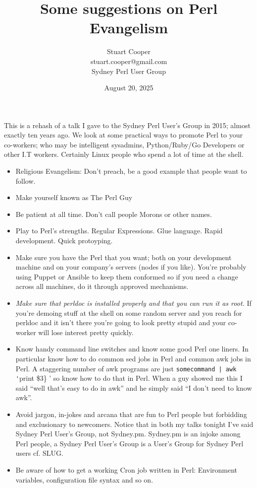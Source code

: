 \documentclass{article}      %
\title{Some suggestions on Perl Evangelism}
\author{Stuart Cooper\\stuart.cooper@gmail.com\\Sydney Perl User Group}
\date{August 20, 2025}
\begin{document}

\maketitle                   %

This is a rehash of a talk I gave to the Sydney Perl User's Group in
2015; almost exactly ten years ago. We look at some practical ways to
promote Perl to your co-workers; who may be intelligent sysadmins,
Python/Ruby/Go Developers or other I.T workers. Certainly Linux people
who spend a lot of time at the shell.

\begin{itemize}
  \item Religious Evangelism: Don't preach, be a good example that
    people want to follow.
  \item Make yourself known as The Perl Guy
  \item Be patient at all time. Don't call people Morons or other
    names. 
  \item Play to Perl's strengths. Regular Expressions. Glue
    language. Rapid development. Quick protoyping.
  \item Make sure you have the Perl that you want; both on your
    development machine and on your company's servers (nodes if you
    like). You're probably using Puppet or Ansible to keep them
    conformed so if you need a change across all machines, do it
    through approved mechanisms.
  \item \emph{Make sure that \emph{perldoc} is installed properly and that
  you can run it as root.} If you're demoing stuff at the shell on some
    random server and you reach for perldoc and it isn't there you're
    going to look pretty stupid and your co-worker will lose interest
    pretty quickly.
  \item Know handy command line switches and know some good Perl one
    liners. In particular know how to do common sed jobs in Perl and
    common awk jobs in Perl. A staggering number of awk programs are
    just \verb{somecommand | awk '{print \$3\} ' so know how to do that
    in Perl. When a guy showed me this I said ``well that's easy to do
    in awk'' and he simply said ``I don't need to know awk''.
  \item Avoid jargon, in-jokes and arcana that are fun to Perl people
    but forbidding and exclusionary to newcomers. Notice that in both
    my talks tonight I've said Sydney Perl User's Group, not
    Sydney.pm. Sydney.pm is an injoke among Perl people, a Sydney Perl
    User's Group is a User's Group for Sydney Perl users cf. SLUG.
  \item Be aware of how to get a working Cron job written in Perl:
    Environment variables, configuration file syntax and so on.
\end{itemize}
\end{document}
